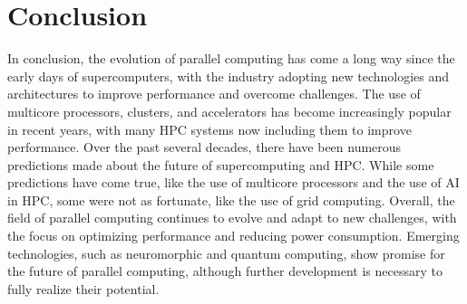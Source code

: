 \documentclass[twocolumn,12pt, singlespace]{IEEEtran}
\begin{document}
\section{Conclusion}
In conclusion, the evolution of parallel computing has come a long way since the early days of supercomputers, with the industry adopting new technologies and architectures to improve performance and overcome challenges. The use of multicore processors, clusters, and accelerators has become increasingly popular in recent years, with many HPC systems now including them to improve performance. Over the past several decades, there have been numerous predictions made about the future of supercomputing and HPC. While some predictions have come true, like the use of multicore processors and the use of AI in HPC, some were not as fortunate, like the use of grid computing. Overall, the field of parallel computing continues to evolve and adapt to new challenges, with the focus on optimizing performance and reducing power consumption. Emerging technologies, such as neuromorphic and quantum computing, show promise for the future of parallel computing, although further development is necessary to fully realize their potential.


\end{document}
